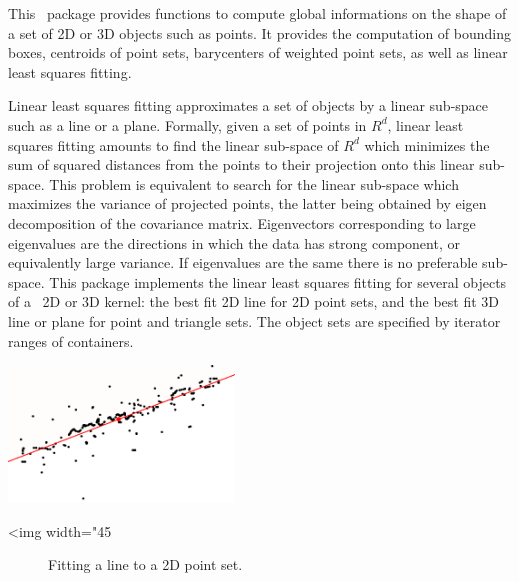 This \cgal\ package provides functions to compute global informations
on the shape of a set of 2D or 3D objects such as points. It provides the computation of bounding boxes, centroids of point sets, barycenters of weighted point sets, as well as linear least squares fitting.

Linear least squares fitting approximates a set of objects by a linear
sub-space such as a line or a plane. Formally, given a set of points in $R^d$, linear least squares fitting amounts
to find the linear sub-space of $R^d$ which minimizes the sum of squared
distances from the points to their projection onto this linear sub-space. This
problem is equivalent to search for the linear sub-space which maximizes the
variance of projected points, the latter being obtained by eigen decomposition
of the covariance matrix. Eigenvectors corresponding to large eigenvalues are
the directions in which the data has strong component, or equivalently large
variance. If eigenvalues are the same there is no preferable sub-space.
This package implements the linear least squares fitting for
several objects of a \cgal\ 2D or 3D kernel: the best fit 2D line for 2D
point sets, and the best fit 3D line or plane for point and
triangle sets. The object sets are specified by iterator ranges of
containers.

\begin{center}
    \label{PCA}
    \begin{ccTexOnly}
      \includegraphics[width=0.45\textwidth]{Principal_component_analysis/fit_2d}
    \end{ccTexOnly}
    \begin{ccHtmlOnly}
        <img width="45%
    \end{ccHtmlOnly}
    \begin{figure}[h]
        \caption{Fitting a line to a 2D point set.}
    \end{figure}
\end{center}

